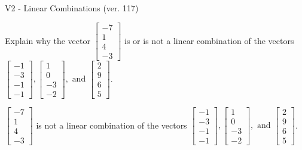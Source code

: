 \begin{exercise}
  \begin{exerciseTitle}V2 - Linear Combinations (ver. 117)\end{exerciseTitle}
  \begin{exerciseStatement}
    Explain why the vector \(\left[\begin{array}{c}
-7 \\
1 \\
4 \\
-3
\end{array}\right]\)  is or is not a linear 
	combination of the vectors \(\left[\begin{array}{c}
-1 \\
-3 \\
-1 \\
-1
\end{array}\right] , \left[\begin{array}{c}
1 \\
0 \\
-3 \\
-2
\end{array}\right] , \text{ and } \left[\begin{array}{c}
2 \\
9 \\
6 \\
5
\end{array}\right]\).
	


  \end{exerciseStatement}
  \begin{exerciseAnswer}
   \(\left[\begin{array}{c}
-7 \\
1 \\
4 \\
-3
\end{array}\right]\) 
  	 is not  
	a linear combination of the vectors \(\left[\begin{array}{c}
-1 \\
-3 \\
-1 \\
-1
\end{array}\right] , \left[\begin{array}{c}
1 \\
0 \\
-3 \\
-2
\end{array}\right] , \text{ and } \left[\begin{array}{c}
2 \\
9 \\
6 \\
5
\end{array}\right]\).

	
  


  \end{exerciseAnswer}
\end{exercise}